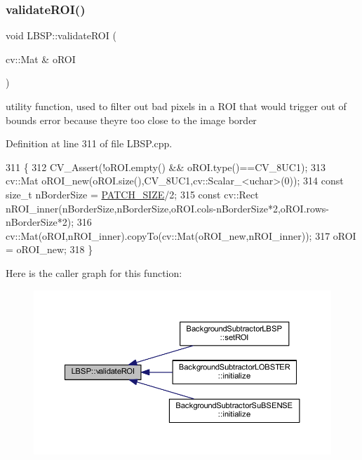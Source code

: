 \subsubsection{\texorpdfstring{validate\+R\+O\+I()}{validateROI()}}
{\footnotesize\ttfamily void L\+B\+S\+P\+::validate\+R\+OI (\begin{DoxyParamCaption}\item[{cv\+::\+Mat \&}]{o\+R\+OI }\end{DoxyParamCaption})\hspace{0.3cm}{\ttfamily [static]}}



utility function, used to filter out bad pixels in a R\+OI that would trigger out of bounds error because they\textquotesingle{}re too close to the image border 



Definition at line 311 of file L\+B\+S\+P.\+cpp.


\begin{DoxyCode}
311                                   \{
312     CV\_Assert(!oROI.empty() && oROI.type()==CV\_8UC1);
313     cv::Mat oROI\_new(oROI.size(),CV\_8UC1,cv::Scalar\_<uchar>(0));
314     \textcolor{keyword}{const} \textcolor{keywordtype}{size\_t} nBorderSize = \mbox{\hyperlink{class_l_b_s_p_aa98abb79a155d3a2b416c2ab32e74929}{PATCH\_SIZE}}/2;
315     \textcolor{keyword}{const} cv::Rect nROI\_inner(nBorderSize,nBorderSize,oROI.cols-nBorderSize*2,oROI.rows-nBorderSize*2);
316     cv::Mat(oROI,nROI\_inner).copyTo(cv::Mat(oROI\_new,nROI\_inner));
317     oROI = oROI\_new;
318 \}
\end{DoxyCode}
Here is the caller graph for this function\+:\nopagebreak
\begin{figure}[H]
\begin{center}
\leavevmode
\includegraphics[width=350pt]{class_l_b_s_p_ad97557be4bc6cfd7b0fa4b01ab8f8c55_icgraph}
\end{center}
\end{figure}
\mbox{\label{class_l_b_s_p_a8a669d927653d7ba62c4097b306e0d5a}} 
